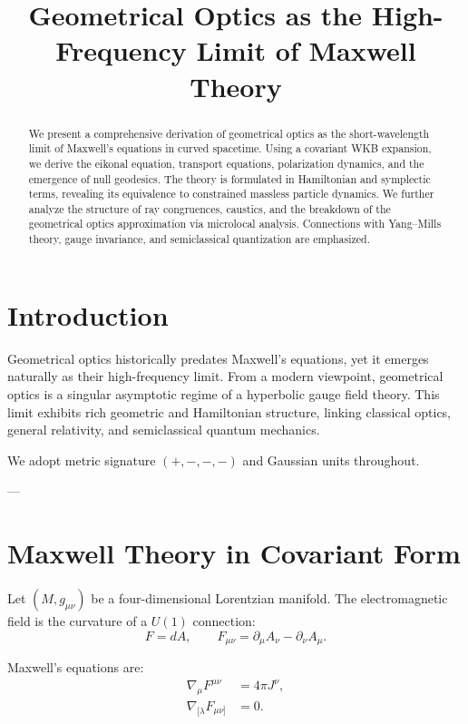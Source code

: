 \documentclass[12pt]{article}
\title{Geometrical Optics as the High-Frequency Limit of Maxwell Theory}
\author{}
\date{}
\begin{document}
\maketitle

\begin{abstract}
We present a comprehensive derivation of geometrical optics as the short-wavelength limit of Maxwell’s equations in curved spacetime. Using a covariant WKB expansion, we derive the eikonal equation, transport equations, polarization dynamics, and the emergence of null geodesics. The theory is formulated in Hamiltonian and symplectic terms, revealing its equivalence to constrained massless particle dynamics. We further analyze the structure of ray congruences, caustics, and the breakdown of the geometrical optics approximation via microlocal analysis. Connections with Yang--Mills theory, gauge invariance, and semiclassical quantization are emphasized.
\end{abstract}

\tableofcontents

\section{Introduction}

Geometrical optics historically predates Maxwell’s equations, yet it emerges naturally as their high-frequency limit. From a modern viewpoint, geometrical optics is a singular asymptotic regime of a hyperbolic gauge field theory. This limit exhibits rich geometric and Hamiltonian structure, linking classical optics, general relativity, and semiclassical quantum mechanics.

We adopt metric signature $(+,-,-,-)$ and Gaussian units throughout.

---

\section{Maxwell Theory in Covariant Form}

Let $(M,g_{\mu\nu})$ be a four-dimensional Lorentzian manifold. The electromagnetic field is the curvature of a $U(1)$ connection:
\[
F = dA, \qquad F_{\mu\nu} = \partial_\mu A_\nu - \partial_\nu A_\mu.
\]

Maxwell’s equations are:
\begin{align}
\nabla_\mu F^{\mu\nu} &= 4\pi J^\nu, \\
\nabla_{[\lambda} F_{\mu\nu]} &= 0.
\end{align}
\end{document}
